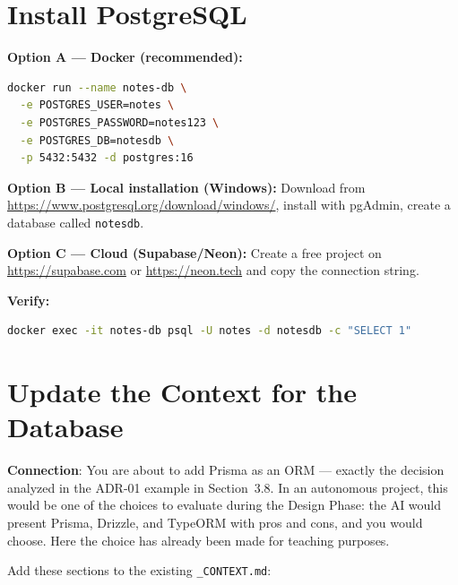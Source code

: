 \section{Install PostgreSQL}

\begin{praticabox}[title={Hands-On --- PostgreSQL Setup}]
\textbf{Option A --- Docker (recommended):}
\begin{lstlisting}[language=bash]
docker run --name notes-db \
  -e POSTGRES_USER=notes \
  -e POSTGRES_PASSWORD=notes123 \
  -e POSTGRES_DB=notesdb \
  -p 5432:5432 -d postgres:16
\end{lstlisting}

\textbf{Option B --- Local installation (Windows):}
Download from \url{https://www.postgresql.org/download/windows/}, install with pgAdmin, create a database called \texttt{notesdb}.

\textbf{Option C --- Cloud (Supabase/Neon):}
Create a free project on \url{https://supabase.com} or \url{https://neon.tech} and copy the connection string.

\textbf{Verify:}
\begin{lstlisting}[language=bash]
docker exec -it notes-db psql -U notes -d notesdb -c "SELECT 1"
\end{lstlisting}
\end{praticabox}

\section{Update the Context for the Database}

\begin{notebox}
\textbf{Connection}: You are about to add Prisma as an ORM --- exactly the decision analyzed in the ADR-01 example in Section~3.8. In an autonomous project, this would be one of the choices to evaluate during the Design Phase: the AI would present Prisma, Drizzle, and TypeORM with pros and cons, and you would choose. Here the choice has already been made for teaching purposes.
\end{notebox}

\begin{praticabox}[title={Hands-On --- Update the \texttt{\_CONTEXT.md}}]
Add these sections to the existing \texttt{\_CONTEXT.md}:
\end{praticabox}

